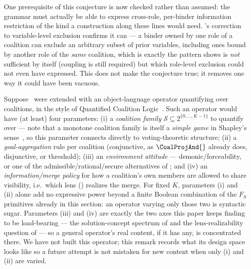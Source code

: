 \begin{remark}
One prerequisite of this conjecture is now checked rather than assumed: the
grammar must actually be able to express cross-role, per-binder information
restriction of the kind a construction along these lines would need.
's correction to variable-level exclusion confirms it
can --- a binder owned by one role of a coalition can exclude an arbitrary
subset of prior variables, including ones bound by another role of the
\emph{same} coalition, which is exactly the pattern
 shows is \emph{not} sufficient by
itself (coupling is still required) but which role-level exclusion could not
even have expressed. This does not make the conjecture true; it removes one
way it could have been vacuous.
\end{remark}

\begin{remark}
\label{rem:coalition-operator-parameters}
Suppose \KFOL\ were extended with an object-language operator quantifying
over coalitions, in the style of Quantified Coalition
Logic~\cite{AgotnesVanDerHoekWooldridge2008QCL}. Such an operator would have
(at least) four parameters: (i) a \emph{coalition family} $\mathcal S
\subseteq 2^{\{0,\dots,K-1\}}$ to quantify over --- note that a monotone
coalition family is itself a \emph{simple game} in Shapley's
sense~\cite{Shapley1962CompoundSimpleGames}, so this parameter connects
directly to voting-theoretic structure; (ii) a \emph{goal-aggregation} rule
per coalition (conjunctive, as $\CoalProjAnd{}$ already does, disjunctive, or
threshold); (iii) an \emph{environment attitude} --- demonic/forceability, or
one of the admissible/rational/secure alternatives of
; and (iv) an \emph{information/merge policy} for how a
coalition's own members are allowed to share visibility, i.e.\ which lens
() realizes the merge. For fixed $K$, parameters (i)
and (ii) alone add no expressive power beyond a finite Boolean combination of
the $F_S$ primitives already in this section: an operator varying only those
two is syntactic sugar. Parameters (iii) and (iv) are exactly the two axes
this paper keeps finding to be load-bearing --- the solution-concept
spectrum of  and the lens-realizability question of
 --- so a general operator's real content, if it has
any, is concentrated there. We have not built this operator; this remark
records what its design space looks like so a future attempt is not mistaken
for new content when only (i) and (ii) are varied.
\end{remark}

